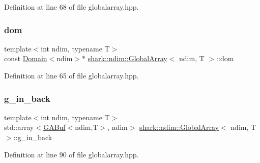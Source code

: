 Definition at line 68 of file globalarray.\+hpp.

\hypertarget{classshark_1_1ndim_1_1_global_array_a412e192f4c7a15888da625ae833e8d3e}{}\label{classshark_1_1ndim_1_1_global_array_a412e192f4c7a15888da625ae833e8d3e} 
\subsubsection{\texorpdfstring{dom}{dom}}
{\footnotesize\ttfamily template$<$int ndim, typename T$>$ \\
const \hyperlink{classshark_1_1ndim_1_1_domain}{Domain}$<$ndim$>$$\ast$ \hyperlink{classshark_1_1ndim_1_1_global_array}{shark\+::ndim\+::\+Global\+Array}$<$ ndim, T $>$\+::dom\hspace{0.3cm}{\ttfamily [private]}}



Definition at line 65 of file globalarray.\+hpp.

\hypertarget{classshark_1_1ndim_1_1_global_array_a148e8382e63e8ff0c9fece28f1131702}{}\label{classshark_1_1ndim_1_1_global_array_a148e8382e63e8ff0c9fece28f1131702} 
\subsubsection{\texorpdfstring{g\+\_\+in\+\_\+back}{g\_in\_back}}
{\footnotesize\ttfamily template$<$int ndim, typename T$>$ \\
std\+::array$<$\hyperlink{classshark_1_1ndim_1_1_g_a_buf}{G\+A\+Buf}$<$ndim,T$>$, ndim$>$ \hyperlink{classshark_1_1ndim_1_1_global_array}{shark\+::ndim\+::\+Global\+Array}$<$ ndim, T $>$\+::g\+\_\+in\+\_\+back}



Definition at line 90 of file globalarray.\+hpp.

\hypertarget{classshark_1_1ndim_1_1_global_array_a2f3fe48d925bc0c3a489b83203eaddfe}{}\label{classshark_1_1ndim_1_1_global_array_a2f3fe48d925bc0c3a489b83203eaddfe} 
